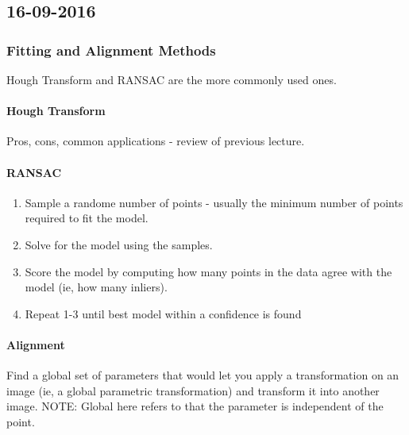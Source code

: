 \subsection{16-09-2016}
\subsubsection{Fitting and Alignment Methods}
Hough Transform and RANSAC are the more commonly used ones.
\paragraph{Hough Transform} Pros, cons, common applications - review of previous lecture.
\paragraph{RANSAC}
\begin{enumerate}
	\item Sample a randome number of points - usually the minimum number of points required to fit the model.
	\item Solve for the model using the samples.
	\item Score the model by computing how many points in the data agree with the model (ie, how many inliers).
	\item Repeat 1-3 until best model within a confidence is found	
\end{enumerate}

\paragraph{Alignment} Find a global set of parameters that would let you apply a transformation on an image (ie, a global parametric transformation) and transform it into another image. NOTE: Global here refers to that the parameter is independent of the point.
